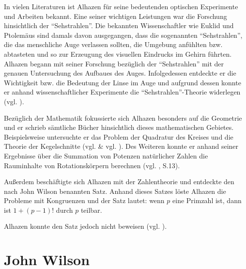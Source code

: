 In vielen Literaturen ist Alhazen für seine bedeutenden
optischen Experimente und Arbeiten bekannt. Eine seiner
wichtigen Leistungen war die Forschung hinsichtlich der
``Sehstrahlen''. Die bekannten Wissenschaftler wie Euklid
und Ptolemäus sind damals davon ausgegangen, dass die
sogenannten ``Sehstrahlen'', die das menschliche Auge
verlassen sollten, die Umgebung anfühlten bzw. abtasteten
und so zur Erzeugung des visuellen Eindrucks im Gehirn
führten. Alhazen begann mit seiner Forschung bezüglich
der ``Sehstrahlen'' mit der genauen Untersuchung des
Aufbaues des Auges. Infolgedessen entdeckte er die
Wichtigkeit bzw. die Bedeutung der Linse im Auge und
aufgrund dessen konnte er anhand wissenschaftlicher
Experimente die ``Sehstrahlen''-Theorie widerlegen
(vgl. \cite{alhazen}).

Bezüglich der Mathematik fokussierte sich Alhazen
besonders auf die Geometrie und er schrieb sämtliche
Bücher hinsichtlich dieses mathematischen Gebietes.
Beispielsweise untersuchte er das Problem der Quadratur
des Kreises und die Theorie der Kegelschnitte
(vgl. \cite{oconnor_alhazen} \& vgl. \cite{rashed}).
Des Weiteren konnte er anhand seiner Ergebnisse über
die Summation von Potenzen natürlicher Zahlen die
Rauminhalte von Rotationskörpern berechnen
(vgl. \cite{ziegenbalg}, S.13).

Außerdem beschäftigte sich Alhazen mit der Zahlentheorie
und entdeckte den nach John Wilson benannten Satz.
Anhand dieses Satzes löste Alhazen die Probleme mit
Kongruenzen und der Satz lautet: wenn $p$ eine Primzahl
ist, dann ist $1+(p-1)!$ durch $p$ teilbar.

Alhazen konnte den Satz jedoch nicht beweisen
(vgl. \cite{oconnor_alhazen}).


\section{John Wilson}

